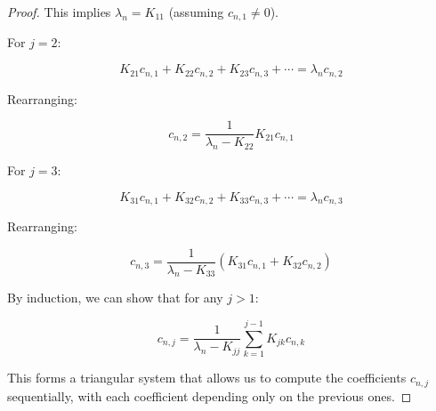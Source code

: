 \documentclass{article}
\begin{document}
\begin{proof}
This implies $\lambda_n = K_{11}$ (assuming $c_{n,1} \neq 0$).

For $j = 2$:

\begin{equation}
    K_{21}c_{n,1} + K_{22}c_{n,2} + K_{23}c_{n,3} + \cdots = \lambda_n c_{n,2}
\end{equation}

Rearranging:

\begin{equation}
    c_{n,2} = \frac{1}{\lambda_n - K_{22}} K_{21}c_{n,1}
\end{equation}

For $j = 3$:

\begin{equation}
    K_{31}c_{n,1} + K_{32}c_{n,2} + K_{33}c_{n,3} + \cdots = \lambda_n c_{n,3}
\end{equation}

Rearranging:

\begin{equation}
    c_{n,3} = \frac{1}{\lambda_n - K_{33}} (K_{31}c_{n,1} + K_{32}c_{n,2})
\end{equation}

By induction, we can show that for any $j > 1$:

\begin{equation}
    c_{n,j} = \frac{1}{\lambda_n - K_{jj}} \sum_{k=1}^{j-1} K_{jk}c_{n,k}
\end{equation}

This forms a triangular system that allows us to compute the coefficients $c_{n,j}$ sequentially, with each coefficient depending only on the previous ones.
\end{proof}
\end{document}
